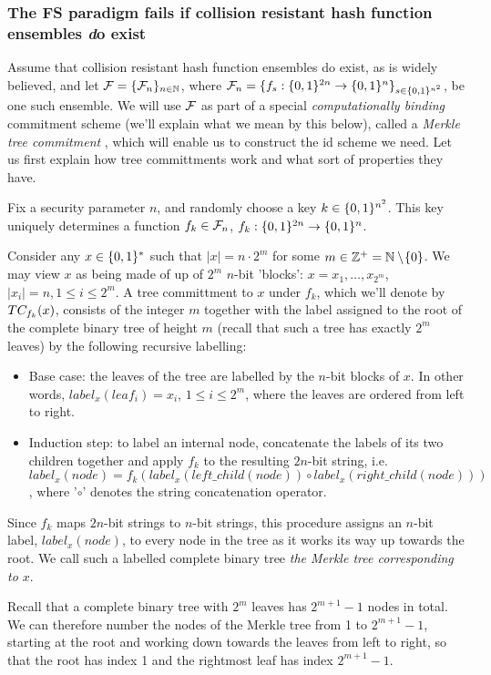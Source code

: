 \documentclass[12pt,twoside]{article}
\begin{document}
\subsubsection{The FS paradigm fails if collision resistant hash function 
ensembles {\emph do} exist}
Assume that collision resistant hash function ensembles do exist, as is
widely believed, and let $\fanf = \ens{\fanf}{n}$, where
$\fanf_n = \{\func{f_s}{\strs{2n}}{\strs{n}}\}_{s \in \strs{n^2}}$, be one 
such ensemble. We will use $\fanf$ as part of a special {\it computationally 
binding} commitment scheme (we'll explain what we mean by this below), called 
a {\it Merkle tree commitment} \cite{merkle:tree}, which will enable us to
construct the id scheme we need. Let us first explain how tree committments 
work and what sort of properties they have.

Fix a security parameter $n$, and randomly choose a key $k \in \strs{n^2}$.
This key uniquely determines a function $f_k \in \fanf_n$,
$\func{f_k}{\strs{2n}}{\strs{n}}$. 

Consider any $x \in \strs{*}$ such that $|x| = n\cdot2^m$ for some $m \in 
\pints = \nats \setminus \!\{0\}$. We may view $x$ as being made of up of 
$2^m$ $n$-bit 'blocks': $x = x_1,\dots,x_{2^m}$, $|x_i| = n, 1 \leq i 
\leq 2^m$. A tree committment to $x$ under $f_k$, which we'll denote by
$\merk{x}{k}$, consists of the integer $m$ together with the label assigned to 
the root of the complete binary tree of height $m$ (recall that such a tree 
has exactly $2^m$ leaves) by the following recursive labelling:
\begin{itemize}
\item Base case: the leaves of the tree are labelled by the $n$-bit blocks of 
$x$. In other words, $label_x(leaf_i) = x_i$, $1 \leq i \leq 2^m$, where the
leaves are ordered from left to right.
\item Induction step: to label an internal node, concatenate the labels of its
two children together and apply $f_k$ to the resulting $2n$-bit string, 
i.e. $label_x(node) = f_k(label_x(left\_child(node))\circ 
label_x(right\_child(node)))$, where '$\circ$' denotes the string concatenation 
operator. 
\end{itemize}
Since $f_k$ maps $2n$-bit strings to $n$-bit strings, this procedure assigns
an $n$-bit label, $label_x(node)$, to every node in the tree as it works its 
way up towards the root. We call such a labelled complete binary tree {\it the
Merkle tree corresponding to $x$}. 

Recall that a complete binary tree with
$2^m$ leaves has $2^{m+1} - 1$ nodes in total. We can therefore number the 
nodes of the Merkle tree from 1 to $2^{m+1} - 1$, starting at the root and 
working down towards the leaves from left to right, so that the root has index
1 and the rightmost leaf has index $2^{m+1} - 1$.  
\end{document}
